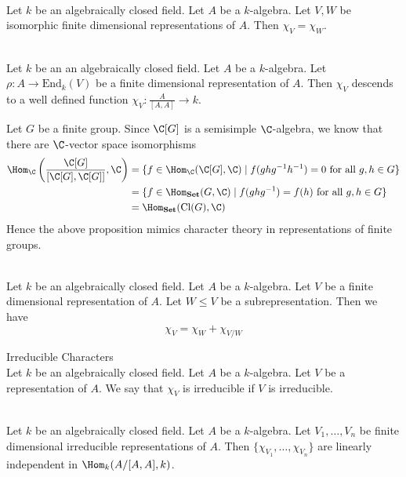 \documentclass[a4paper]{article}
\begin{document}
\begin{prp}{}{}\\
Let $k$ be an algebraically closed field. Let $A$ be a $k$-algebra. Let $V,W$ be isomorphic finite dimensional representations of $A$. Then $\chi_V=\chi_W$. 
\end{prp}

\begin{prp}{}{}\\
Let $k$ be an an algebraically closed field. Let $A$ be a $k$-algebra. Let $\rho:A\to\text{End}_k(V)$ be a finite dimensional representation of $A$. Then $\chi_V$ descends to a well defined function $\chi_V:\frac{A}{[A,A]}\to k$. 
\end{prp}

Let $G$ be a finite group. Since $\C[G]$ is a semisimple $\C$-algebra, we know that there are $\C$-vector space isomorphisms
\begin{align*}
\Hom_\C\left(\frac{\C[G]}{[\C[G],\C[G]]},\C\right)&=\{f\in\Hom_\C(\C[G],\C)\;|\;f(ghg^{-1}h^{-1})=0\text{ for all }g,h\in G\}\\
&=\{f\in\Hom_{\bold{Set}}(G,\C)\;|\;f(ghg^{-1})=f(h)\text{ for all }g,h\in G\}\\
&=\Hom_{\bold{Set}}(\text{Cl}(G),\C)
\end{align*}
Hence the above proposition mimics character theory in representations of finite groups. 

\begin{lmm}{}{}\\
Let $k$ be an algebraically closed field. Let $A$ be a $k$-algebra. Let $V$ be a finite dimensional representation of $A$. Let $W\leq V$ be a subrepresentation. Then we have $$\chi_V=\chi_W+\chi_{V/W}$$
\end{lmm}

\begin{defn}{Irreducible Characters}{}\\
Let $k$ be an algebraically closed field. Let $A$ be a $k$-algebra. Let $V$ be a representation of $A$. We say that $\chi_V$ is irreducible if $V$ is irreducible. 
\end{defn}

\begin{prp}{}{}\\
Let $k$ be an algebraically closed field. Let $A$ be a $k$-algebra. Let $V_1,\dots,V_n$ be finite dimensional irreducible representations of $A$. Then $\{\chi_{V_1},\dots,\chi_{V_n}\}$ are linearly independent in $\Hom_k(A/[A,A],k)$. 
\end{prp}
\end{document}
